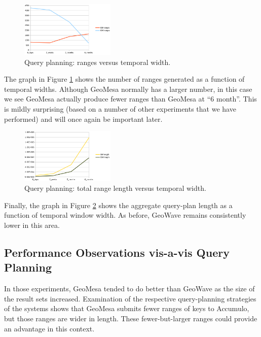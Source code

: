 \begin{figure}[h!tb]
  \centering
  \includegraphics[width=0.40\textwidth]{../docs/img/query-planning/window-ranges.png}
  \caption{Query planning: ranges versus temporal width.}
  \label{planningtimeranges}
\end{figure}

The graph in Figure \ref{planningtimeranges} shows the number of ranges generated as a function of temporal widths.
Although GeoMesa normally has a larger number, in this case we see GeoMesa actually produce fewer ranges than GeoMesa at ``$6$ month''.
This is mildly surprising (based on a number of other experiments that we have performed) and will once again be important later.

\begin{figure}[h!tb]
  \centering
  \includegraphics[width=0.40\textwidth]{../docs/img/query-planning/window-length.png}
  \caption{Query planning: total range length versus temporal width.}
  \label{planningtimelength}
\end{figure}

Finally, the graph in Figure \ref{planningtimelength} shows the aggregate query-plan length as a function of temporal window width.
As before, GeoWave remains consistently lower in this area.

\subsection{Performance Observations vis-a-vis Query Planning}

In those experiments, GeoMesa tended to do better than GeoWave as the size of the result sets increased.
Examination of the respective query-planning strategies of the systems shows that GeoMesa submits fewer ranges of keys to Accumulo, but those ranges are wider in length.
These fewer-but-larger ranges could provide an advantage in this context.

